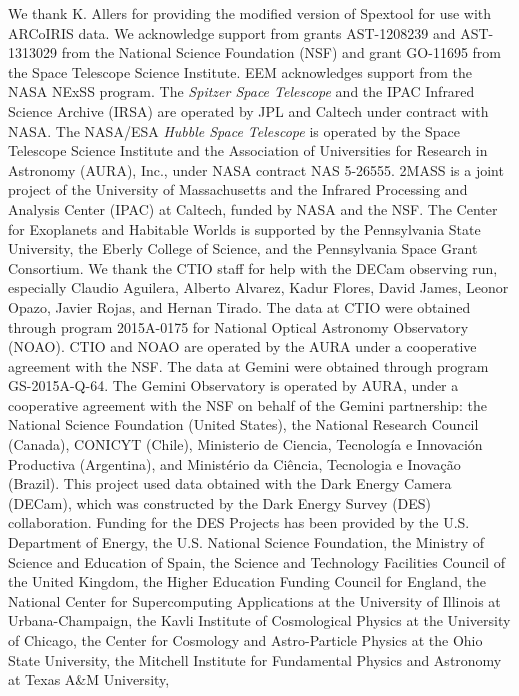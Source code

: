 \documentclass{emulateapj}
\begin{document}
\acknowledgements
We thank K. Allers for providing the modified version of Spextool for use with
ARCoIRIS data. We acknowledge support from grants AST-1208239 and AST-1313029 from the
National Science Foundation (NSF)
and grant GO-11695 from the Space Telescope Science Institute.
EEM acknowledges support from the NASA NExSS program. 
The {\it Spitzer Space Telescope} and the IPAC Infrared Science Archive (IRSA)
are operated by JPL and Caltech under contract with NASA.
The NASA/ESA {\it Hubble Space Telescope} is operated by the 
Space Telescope Science Institute and the Association of Universities
for Research in Astronomy (AURA), Inc., under NASA contract NAS 5-26555.
2MASS is a joint project of the University of
Massachusetts and the Infrared Processing and Analysis Center (IPAC) at
Caltech, funded by NASA and the NSF.
The Center for Exoplanets and Habitable Worlds is supported by the
Pennsylvania State University, the Eberly College of Science, and the
Pennsylvania Space Grant Consortium. 
We thank the CTIO staff for help with the DECam observing run, especially Claudio Aguilera, Alberto Alvarez, Kadur Flores, David James, Leonor Opazo, Javier Rojas, and Hernan Tirado. 
The data at CTIO were obtained 
through program 2015A-0175 for National Optical Astronomy Observatory (NOAO).
CTIO and NOAO are operated by the AURA under a cooperative agreement with the
NSF. 
The data at Gemini were obtained through program GS-2015A-Q-64.
The Gemini Observatory is operated by AURA, under a cooperative agreement with the NSF on behalf of the Gemini partnership: the National Science Foundation (United States), the National Research Council (Canada), CONICYT (Chile), Ministerio de Ciencia, Tecnolog\'{i}a e Innovaci\'{o}n Productiva (Argentina), and Minist\'{e}rio da Ci\^{e}ncia, Tecnologia e Inova\c{c}\~{a}o (Brazil).
This project used data obtained with the Dark Energy Camera (DECam), which was constructed by the Dark Energy Survey (DES) collaboration.
Funding for the DES Projects has been provided by 
the U.S. Department of Energy, the U.S. National Science Foundation, 
the Ministry of Science and Education of Spain, 
the Science and Technology Facilities Council of the United Kingdom, 
the Higher Education Funding Council for England, 
the National Center for Supercomputing Applications at the University of Illinois at Urbana-Champaign, 
the Kavli Institute of Cosmological Physics at the University of Chicago, 
the Center for Cosmology and Astro-Particle Physics at the Ohio State University, 
the Mitchell Institute for Fundamental Physics and Astronomy at Texas A\&M University, 
\end{document}
